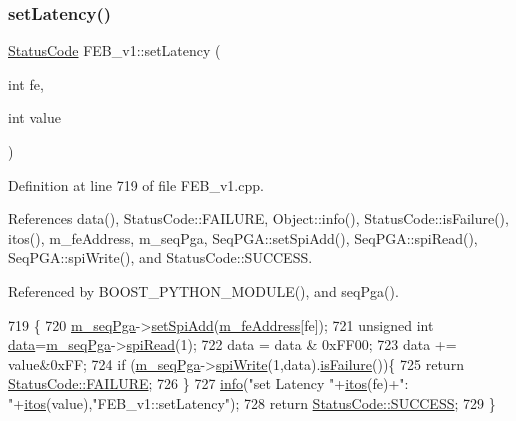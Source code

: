 \subsubsection{\texorpdfstring{set\+Latency()}{setLatency()}}
{\footnotesize\ttfamily \hyperlink{classStatusCode}{Status\+Code} F\+E\+B\+\_\+v1\+::set\+Latency (\begin{DoxyParamCaption}\item[{int}]{fe,  }\item[{int}]{value }\end{DoxyParamCaption})}



Definition at line 719 of file F\+E\+B\+\_\+v1.\+cpp.



References data(), Status\+Code\+::\+F\+A\+I\+L\+U\+RE, Object\+::info(), Status\+Code\+::is\+Failure(), itos(), m\+\_\+fe\+Address, m\+\_\+seq\+Pga, Seq\+P\+G\+A\+::set\+Spi\+Add(), Seq\+P\+G\+A\+::spi\+Read(), Seq\+P\+G\+A\+::spi\+Write(), and Status\+Code\+::\+S\+U\+C\+C\+E\+SS.



Referenced by B\+O\+O\+S\+T\+\_\+\+P\+Y\+T\+H\+O\+N\+\_\+\+M\+O\+D\+U\+L\+E(), and seq\+Pga().


\begin{DoxyCode}
719                                                 \{
720   \hyperlink{classFEB__v1_a6c7804ac86796f233a8393043adf2e77}{m\_seqPga}->\hyperlink{classSeqPGA_ac998ce3a6d9b5f2e88cc8393f8c1df53}{setSpiAdd}(\hyperlink{classFEB__v1_a4e1945c2d5b434125f375e9d0fc6d99f}{m\_feAddress}[fe]);
721   \textcolor{keywordtype}{unsigned} \textcolor{keywordtype}{int} \hyperlink{classFEB__v1_a6bca4320bd3bbbc32efc81097f33421a}{data}=\hyperlink{classFEB__v1_a6c7804ac86796f233a8393043adf2e77}{m\_seqPga}->\hyperlink{classSeqPGA_ab3d0e5e5d4014bc7a92588a76b8713d4}{spiRead}(1);
722   data = data & 0xFF00;
723   data += value&0xFF;
724   \textcolor{keywordflow}{if} (\hyperlink{classFEB__v1_a6c7804ac86796f233a8393043adf2e77}{m\_seqPga}->\hyperlink{classSeqPGA_ad4421841ce4ce8b88ad13f63216f0743}{spiWrite}(1,data).\hyperlink{classStatusCode_a5dd22dc6eb2c52fc4cabc58f6dea2eb7}{isFailure}())\{
725     \textcolor{keywordflow}{return} \hyperlink{classStatusCode_a6f565cbeadc76d14c72f047e5e85eb4ba3da73d4c469762eb9d3c960368252b26}{StatusCode::FAILURE};
726   \}
727   \hyperlink{classObject_a644fd329ea4cb85f54fa6846484b84a8}{info}(\textcolor{stringliteral}{"set Latency "}+\hyperlink{Tools_8h_af330027dbdafb9a30768b3613c553e60}{itos}(fe)+\textcolor{stringliteral}{": "}+\hyperlink{Tools_8h_af330027dbdafb9a30768b3613c553e60}{itos}(value),\textcolor{stringliteral}{"FEB\_v1::setLatency"});
728   \textcolor{keywordflow}{return} \hyperlink{classStatusCode_a6f565cbeadc76d14c72f047e5e85eb4badd0da38d3ba0d922efd1f4619bc37ad8}{StatusCode::SUCCESS};
729 \}
\end{DoxyCode}
\mbox{\label{classFEB__v1_abf7b8a0e6842ecf74a2b1889fbb9a722}} 
